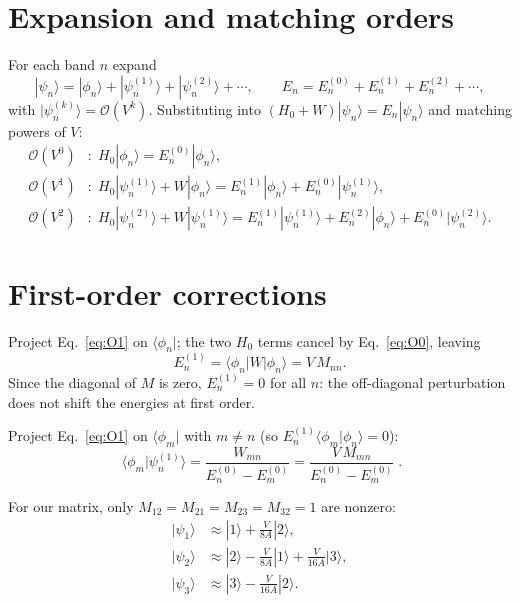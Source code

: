 \documentclass[11pt]{article}
\begin{document}
\section{Expansion and matching orders}

For each band $n$ expand
\begin{equation}
|\psi_n\rangle = |\phi_n\rangle + |\psi_n^{(1)}\rangle + |\psi_n^{(2)}\rangle + \cdots, \qquad
E_n = E_n^{(0)} + E_n^{(1)} + E_n^{(2)} + \cdots,
\end{equation}
with $|\psi_n^{(k)}\rangle = \mathcal O(V^k)$. Substituting into $(H_0 + W)|\psi_n\rangle = E_n|\psi_n\rangle$ and matching powers of $V$:
\begin{align}
\mathcal O(V^0)&:\; H_0|\phi_n\rangle = E_n^{(0)}|\phi_n\rangle, \label{eq:O0}\\
\mathcal O(V^1)&:\; H_0|\psi_n^{(1)}\rangle + W|\phi_n\rangle = E_n^{(1)}|\phi_n\rangle + E_n^{(0)}|\psi_n^{(1)}\rangle, \label{eq:O1}\\
\mathcal O(V^2)&:\; H_0|\psi_n^{(2)}\rangle + W|\psi_n^{(1)}\rangle = E_n^{(1)}|\psi_n^{(1)}\rangle + E_n^{(2)}|\phi_n\rangle + E_n^{(0)}|\psi_n^{(2)}\rangle. \label{eq:O2}
\end{align}

\section{First-order corrections}

Project Eq.~\eqref{eq:O1} on $\langle\phi_n|$; the two $H_0$ terms cancel by Eq.~\eqref{eq:O0}, leaving
\begin{equation}
E_n^{(1)} = \langle\phi_n|W|\phi_n\rangle = V\, M_{nn}.
\end{equation}
Since the diagonal of $M$ is zero, $\boxed{E_n^{(1)} = 0}$ for all $n$: the off-diagonal perturbation does not shift the energies at first order.

Project Eq.~\eqref{eq:O1} on $\langle\phi_m|$ with $m\neq n$ (so $E_n^{(1)}\langle\phi_m|\phi_n\rangle = 0$):
\begin{equation}
\boxed{\;\langle\phi_m|\psi_n^{(1)}\rangle = \frac{W_{mn}}{E_n^{(0)} - E_m^{(0)}} = \frac{V\, M_{mn}}{E_n^{(0)} - E_m^{(0)}}\;}. \label{eq:psi1}
\end{equation}

For our matrix, only $M_{12}=M_{21}=M_{23}=M_{32}=1$ are nonzero:
\begin{align}
|\psi_1\rangle &\approx |1\rangle + \frac{V}{8A}|2\rangle, \\
|\psi_2\rangle &\approx |2\rangle - \frac{V}{8A}|1\rangle + \frac{V}{16A}|3\rangle, \\
|\psi_3\rangle &\approx |3\rangle - \frac{V}{16A}|2\rangle.
\end{align}
\end{document}
